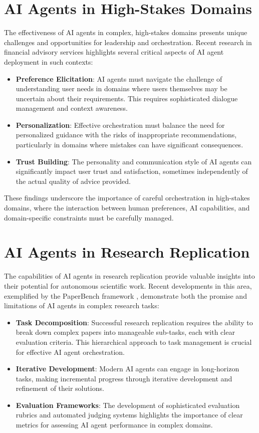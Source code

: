 \documentclass[conference]{IEEEtran}
\begin{document}
\section{AI Agents in High-Stakes Domains}
The effectiveness of AI agents in complex, high-stakes domains presents unique challenges and opportunities for leadership and orchestration. Recent research in financial advisory services \cite{takayanagi2024generative} highlights several critical aspects of AI agent deployment in such contexts:

\begin{itemize}
\item \textbf{Preference Elicitation}: AI agents must navigate the challenge of understanding user needs in domains where users themselves may be uncertain about their requirements. This requires sophisticated dialogue management and context awareness.
\item \textbf{Personalization}: Effective orchestration must balance the need for personalized guidance with the risks of inappropriate recommendations, particularly in domains where mistakes can have significant consequences.
\item \textbf{Trust Building}: The personality and communication style of AI agents can significantly impact user trust and satisfaction, sometimes independently of the actual quality of advice provided.
\end{itemize}

These findings underscore the importance of careful orchestration in high-stakes domains, where the interaction between human preferences, AI capabilities, and domain-specific constraints must be carefully managed.

\section{AI Agents in Research Replication}
The capabilities of AI agents in research replication provide valuable insights into their potential for autonomous scientific work. Recent developments in this area, exemplified by the PaperBench framework \cite{starace2025paperbench}, demonstrate both the promise and limitations of AI agents in complex research tasks:

\begin{itemize}
\item \textbf{Task Decomposition}: Successful research replication requires the ability to break down complex papers into manageable sub-tasks, each with clear evaluation criteria. This hierarchical approach to task management is crucial for effective AI agent orchestration.
\item \textbf{Iterative Development}: Modern AI agents can engage in long-horizon tasks, making incremental progress through iterative development and refinement of their solutions.
\item \textbf{Evaluation Frameworks}: The development of sophisticated evaluation rubrics and automated judging systems highlights the importance of clear metrics for assessing AI agent performance in complex domains.
\end{itemize}
\end{document}
